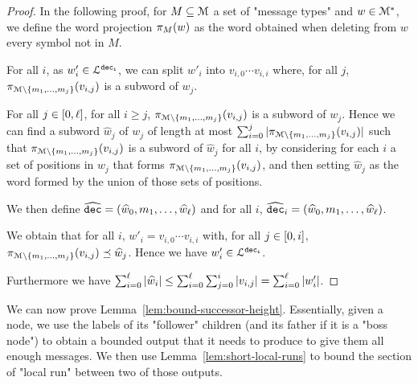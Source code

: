 \begin{proof}
	In the following proof, for $M \subseteq \messages$ a set of "message types" and $w \in \messages^*$, we define the word projection $\wordproj{w}{M}$ as the word obtained when deleting from $w$ every symbol not in $M$.
	
	For all $i$, as $w'_i \in \langdec{\decsymb_i}$, we can split $w'_i$ into $v_{i,0} \cdots v_{i,i}$ where, for all $j$, $\wordproj{v_{i,j}}{\messages\setminus\set{m_1, \ldots, m_{j}}}$ is a subword of $w_j$. 
	
	For all $j \in \nset{0}{\ell}$, for all $i\geq j$, $\wordproj{v_{i,j}}{\messages\setminus\set{m_1, \ldots, m_{j}}}$ is a subword of $w_j$.
	Hence we can find a subword $\widehat{w}_j$ of $w_j$ of length at most $\sum_{i=0}^{j} \size{\wordproj{v_{i,j}}{\messages\setminus\set{m_1, \ldots, m_{j}}}}$ such that $\wordproj{v_{i,j}}{\messages\setminus\set{m_1, \ldots, m_{j}}}$ is a subword of $\widehat{w}_j$ for all $i$, by considering for each $i$ a set of positions in $w_j$ that forms $\wordproj{v_{i,j}}{\messages\setminus\set{m_1, \ldots, m_{j}}}$, and then setting $\widehat{w}_j$ as the word formed by the union of those sets of positions.
	
	We then define $\widehat{\decsymb} = (\widehat{w}_0, m_1, \ldots, \widehat{w}_\ell)$ and for all $i$, $\widehat{\decsymb}_i = (\widehat{w}_0, m_1, \ldots, \widehat{w}_\ell)$.
	
	We obtain that for all $i$, $w'_i = v_{i,0} \cdots v_{i,i}$ with, for all $j \in \nset{0}{i}$, $\wordproj{v_{i,j}}{\messages\setminus\set{m_1, \ldots, m_j}} \subword \widehat{w}_j$. Hence we have $w'_i \in \langdec{\decsymb_i}$.
	
	Furthermore we have $\sum_{i=0}^{\ell} \size{\widehat{w}_i} \leq \sum_{i=0}^{\ell} \sum_{j=0}^i \size{v_{i,j}} = \sum_{i=0}^{\ell} \size{w'_i}$.
\end{proof}

We can now prove Lemma~\ref{lem:bound-successor-height}. Essentially, given a node, we use the labels of its "follower" children (and its father if it is a "boss node") to obtain a bounded output that it needs to produce to give them all enough messages.
We then use Lemma~\ref{lem:short-local-runs} to bound the section of "local run" between two of those outputs.

\lemBoundSuccessorHeight*

